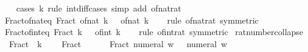 \begin{isabellebody}
%
\isadelimproof
\ \ %
\endisadelimproof
%
\isatagproof
{}\isamarkupfalse%
\ {\isacharparenleft}{\kern0pt}cases\ k\ rule{\isacharcolon}{\kern0pt}\ int{\isacharunderscore}{\kern0pt}diff{\isacharunderscore}{\kern0pt}cases{\isacharparenright}{\kern0pt}\ {\isacharparenleft}{\kern0pt}simp\ add{\isacharcolon}{\kern0pt}\ of{\isacharunderscore}{\kern0pt}nat{\isacharunderscore}{\kern0pt}rat{\isacharparenright}{\kern0pt}%
\endisatagproof
{\isafoldproof}%
%
\isadelimproof
\isanewline
%
\endisadelimproof
\isanewline
{}\isamarkupfalse%
\ Fract{\isacharunderscore}{\kern0pt}of{\isacharunderscore}{\kern0pt}nat{\isacharunderscore}{\kern0pt}eq{\isacharcolon}{\kern0pt}\ {\isachardoublequoteopen}Fract\ {\isacharparenleft}{\kern0pt}of{\isacharunderscore}{\kern0pt}nat\ k{\isacharparenright}{\kern0pt}\ {}\ {\isacharequal}{\kern0pt}\ of{\isacharunderscore}{\kern0pt}nat\ k{\isachardoublequoteclose}\isanewline
%
\isadelimproof
\ \ %
\endisadelimproof
%
\isatagproof
{}\isamarkupfalse%
\ {\isacharparenleft}{\kern0pt}rule\ of{\isacharunderscore}{\kern0pt}nat{\isacharunderscore}{\kern0pt}rat\ {\isacharbrackleft}{\kern0pt}symmetric{\isacharbrackright}{\kern0pt}{\isacharparenright}{\kern0pt}%
\endisatagproof
{\isafoldproof}%
%
\isadelimproof
\isanewline
%
\endisadelimproof
\isanewline
{}\isamarkupfalse%
\ Fract{\isacharunderscore}{\kern0pt}of{\isacharunderscore}{\kern0pt}int{\isacharunderscore}{\kern0pt}eq{\isacharcolon}{\kern0pt}\ {\isachardoublequoteopen}Fract\ k\ {}\ {\isacharequal}{\kern0pt}\ of{\isacharunderscore}{\kern0pt}int\ k{\isachardoublequoteclose}\isanewline
%
\isadelimproof
\ \ %
\endisadelimproof
%
\isatagproof
{}\isamarkupfalse%
\ {\isacharparenleft}{\kern0pt}rule\ of{\isacharunderscore}{\kern0pt}int{\isacharunderscore}{\kern0pt}rat\ {\isacharbrackleft}{\kern0pt}symmetric{\isacharbrackright}{\kern0pt}{\isacharparenright}{\kern0pt}%
\endisatagproof
{\isafoldproof}%
%
\isadelimproof
\isanewline
%
\endisadelimproof
\isanewline
{}\isamarkupfalse%
\ rat{\isacharunderscore}{\kern0pt}number{\isacharunderscore}{\kern0pt}collapse{\isacharcolon}{\kern0pt}\isanewline
\ \ {\isachardoublequoteopen}Fract\ {}\ k\ {\isacharequal}{\kern0pt}\ {}{\isachardoublequoteclose}\isanewline
\ \ {\isachardoublequoteopen}Fract\ {}\ {}\ {\isacharequal}{\kern0pt}\ {}{\isachardoublequoteclose}\isanewline
\ \ {\isachardoublequoteopen}Fract\ {\isacharparenleft}{\kern0pt}numeral\ w{\isacharparenright}{\kern0pt}\ {}\ {\isacharequal}{\kern0pt}\ numeral\ w{\isachardoublequoteclose}\isanewline

\end{isabellebody}
